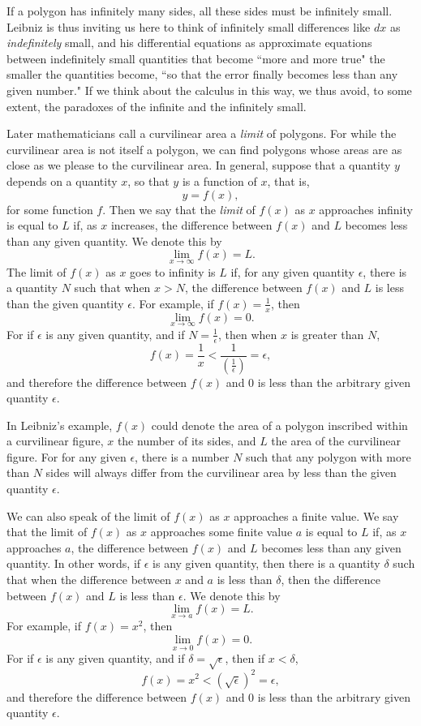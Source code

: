 \documentclass[polutonikogreek,english,twoside,openright]{article}
\begin{document}
If a polygon has infinitely many sides, all these sides must be
infinitely small.  Leibniz is thus inviting us here to think of
infinitely small differences like $dx$ as {\em indefinitely} small,
and his differential equations as approximate equations between
indefinitely small quantities that become ``more and more true" the
smaller the quantities become, ``so that the error finally becomes
less than any given number."  If we think about the calculus in this
way, we thus avoid, to some extent, the paradoxes of the infinite and
the infinitely small.

Later mathematicians call a curvilinear area a {\em limit} of
polygons. For while the curvilinear area is not itself a polygon, we
can find polygons whose areas are as close as we please to the
curvilinear area.  In general, suppose that a quantity $y$ depends on
a quantity $x$, so that $y$ is a function of $x$, that is,
$$y = f(x),$$
for some function $f$.  Then we say that the {\em limit} of $f(x)$ as
$x$ approaches infinity is equal to $L$ if, as $x$ increases, the
difference between $f(x)$ and $L$ becomes less than any given
quantity. We denote this by
$$\lim_{x\rightarrow \infty}f(x) = L.$$
The limit of $f(x)$ as $x$ goes to infinity is $L$ if, for any given
quantity $\epsilon$, there is a quantity $N$ such that when $x>N$, the
difference between $f(x)$ and $L$ is less than the given quantity
$\epsilon$.  For example, if $\displaystyle f(x) = \frac{1}{x}$, then
$$\lim_{x\rightarrow \infty}f(x) = 0.$$
For if $\epsilon$ is any given quantity, and if
$\displaystyle N =\frac{1}{\epsilon}$, then when $x$ is greater than
$N$,
$$f(x)= \frac{1}{x} < \frac{1}{\left(\frac{1}{\epsilon}\right)}= \epsilon,$$
and therefore the difference between $f(x)$ and $0$ is less than the
arbitrary given quantity $\epsilon$.

In Leibniz's example, $f(x)$ could denote the area of a polygon
inscribed within a curvilinear figure, $x$ the number of its sides,
and $L$ the area of the curvilinear figure.  For for any given
$\epsilon$, there is a number $N$ such that any polygon with more than
$N$ sides will always differ from the curvilinear area by less than
the given quantity $\epsilon$.

We can also speak of the limit of $f(x)$ as $x$ approaches a finite
value.  We say that the limit of $f(x)$ as $x$ approaches some finite
value $a$ is equal to $L$ if, as $x$ approaches $a$, the difference
between $f(x)$ and $L$ becomes less than any given quantity.  In other
words, if $\epsilon$ is any given quantity, then there is a quantity
$\delta$ such that when the difference between $x$ and $a$ is less
than $\delta$, then the difference between $f(x)$ and $L$ is less than
$\epsilon$.  We denote this by
$$\lim_{x\rightarrow a}f(x) = L.$$
For example, if $f(x) = x^2$, then 
$$\lim_{x\rightarrow 0}f(x) = 0.$$
For if $\epsilon$ is any given quantity, and if
$\delta = \sqrt{\epsilon}$, then if $x < \delta$,
$$f(x) = x^2 < (\sqrt{\epsilon})^2 = \epsilon,$$
and therefore the difference between $f(x)$ and $0$ is less than the
arbitrary given quantity $\epsilon$.
\end{document}

